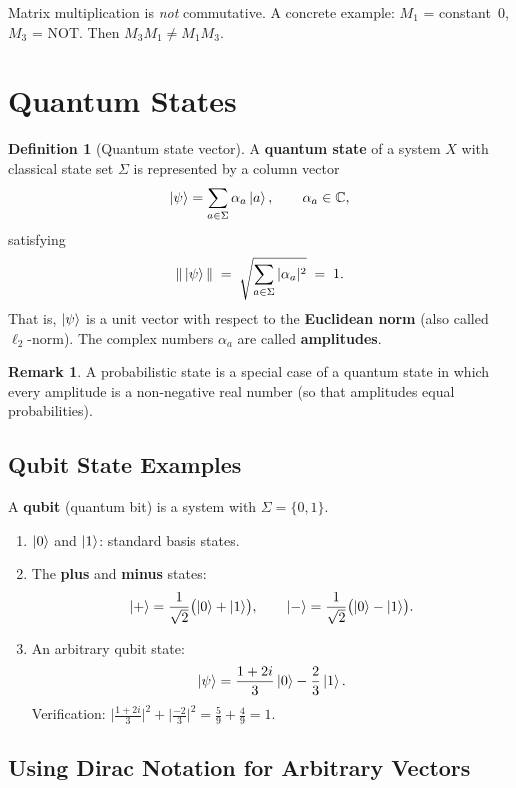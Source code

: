 \documentclass[11pt]{article}
\theoremstyle{definition}
\newtheorem{definition}{Definition}[section]
\newtheorem{remark}{Remark}[section]
\begin{document}
Matrix multiplication is \emph{not} commutative.  A concrete example: $M_1$ = constant~$0$, $M_3$ = NOT.  Then $M_3 M_1 \neq M_1 M_3$.

\section{Quantum States}

\begin{definition}[Quantum state vector]
A \textbf{quantum state} of a system $X$ with classical state set $\Sigma$ is represented by a column vector
\[
    \ket{\psi} = \sum_{a\in\Sigma} \alpha_a \ket{a}, \qquad \alpha_a\in\mathbb{C},
\]
satisfying
\[
    \|\ket{\psi}\| \;=\; \sqrt{\sum_{a\in\Sigma}|\alpha_a|^2} \;=\; 1.
\]
That is, $\ket{\psi}$ is a unit vector with respect to the \textbf{Euclidean norm} (also called $\ell_2$-norm).  The complex numbers $\alpha_a$ are called \textbf{amplitudes}.
\end{definition}

\begin{remark}
A probabilistic state is a special case of a quantum state in which every amplitude is a non-negative real number (so that amplitudes equal probabilities).
\end{remark}

\subsection{Qubit State Examples}

A \textbf{qubit} (quantum bit) is a system with $\Sigma=\{0,1\}$.

\begin{enumerate}
    \item $\ket{0}$ and $\ket{1}$: standard basis states.
    \item The \textbf{plus} and \textbf{minus} states:
    \[
        \ket{+} = \frac{1}{\sqrt{2}}\bigl(\ket{0}+\ket{1}\bigr), \qquad
        \ket{-} = \frac{1}{\sqrt{2}}\bigl(\ket{0}-\ket{1}\bigr).
    \]
    \item An arbitrary qubit state:
    \[
        \ket{\psi} = \frac{1+2i}{3}\ket{0} - \frac{2}{3}\ket{1}.
    \]
    Verification: $\bigl|\tfrac{1+2i}{3}\bigr|^2 + \bigl|\tfrac{-2}{3}\bigr|^2 = \tfrac{5}{9}+\tfrac{4}{9}=1$.
\end{enumerate}

\subsection{Using Dirac Notation for Arbitrary Vectors}
\end{document}
